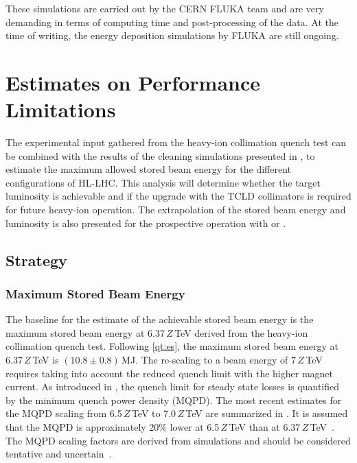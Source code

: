 These simulations are carried out by the CERN FLUKA team and are very demanding in terms of computing time and post-processing of the data. At the time of writing, the energy deposition simulations by FLUKA are still ongoing.



\newpage

\section{Estimates on Performance Limitations} \label{chap:perflimi}

The experimental input gathered from the heavy-ion collimation quench test can be combined with the results of the cleaning simulations presented in , to estimate the maximum allowed stored beam energy for the different configurations of HL-LHC. This analysis will determine whether the target luminosity is achievable and if the upgrade with the TCLD collimators is required for future heavy-ion operation. The extrapolation of the stored beam energy and luminosity is also presented for the prospective operation with  or . 

\subsection{Strategy}

\subsubsection{Maximum Stored Beam Energy}
The baseline for the estimate of the achievable stored beam energy is the maximum stored beam energy at 6.37$\,Z\,$TeV derived from the heavy-ion collimation quench test. Following \eqref{qt:es}, the maximum stored beam energy at 6.37$\,Z\,$TeV is $(10.8 \pm 0.8)\,$MJ. The re-scaling to a beam energy of $7\,Z\,$TeV requires taking into account the reduced quench limit with the higher magnet current. As introduced in , the quench limit for steady state losses is quantified by the minimum quench power density (MQPD). The most recent estimates for the MQPD scaling from 6.5$\,Z\,$TeV to 7.0$\,Z\,$TeV are summarized in . It is assumed that the MQPD is approximately 20\% lower at 6.5$\,Z\,$TeV than at $6.37\,Z\,$TeV~\cite{vervej:private}. The MQPD scaling factors are derived from simulations and should be considered tentative and uncertain~\cite{Verweij:col}. 
\vspace{0.2cm}

